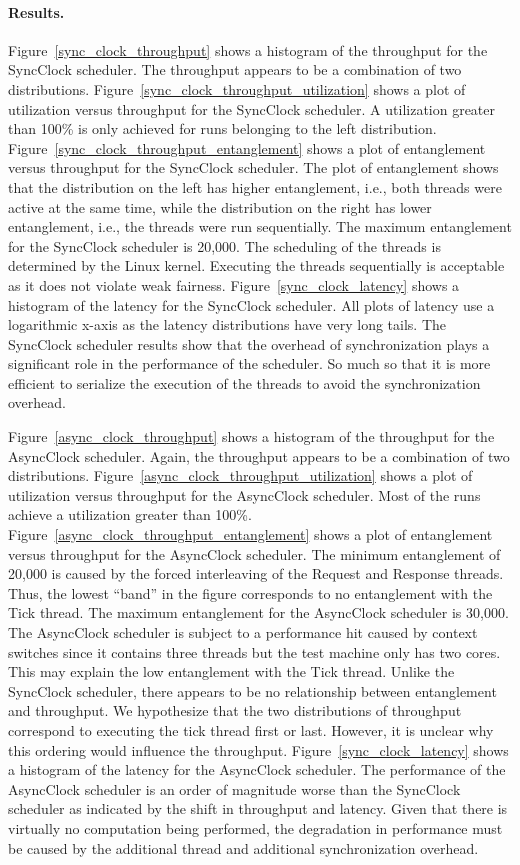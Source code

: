 \paragraph{Results.}
Figure~\ref{sync_clock_throughput} shows a histogram of the throughput for the SyncClock scheduler.
The throughput appears to be a combination of two distributions.
Figure~\ref{sync_clock_throughput_utilization} shows a plot of utilization versus throughput for the SyncClock scheduler.
A utilization greater than 100\% is only achieved for runs belonging to the left distribution.
Figure~\ref{sync_clock_throughput_entanglement} shows a plot of entanglement versus throughput for the SyncClock scheduler.
The plot of entanglement shows that the distribution on the left has higher entanglement, i.e., both threads were active at the same time, while the distribution on the right has lower entanglement, i.e., the threads were run sequentially.
The maximum entanglement for the SyncClock scheduler is 20,000.
The scheduling of the threads is determined by the Linux kernel.
Executing the threads sequentially is acceptable as it does not violate weak fairness.
Figure~\ref{sync_clock_latency} shows a histogram of the latency for the SyncClock scheduler.
All plots of latency use a logarithmic x-axis as the latency distributions have very long tails.
The SyncClock scheduler results show that the overhead of synchronization plays a significant role in the performance of the scheduler.
So much so that it is more efficient to serialize the execution of the threads to avoid the synchronization overhead.

Figure~\ref{async_clock_throughput} shows a histogram of the throughput for the AsyncClock scheduler.
Again, the throughput appears to be a combination of two distributions.
Figure~\ref{async_clock_throughput_utilization} shows a plot of utilization versus throughput for the AsyncClock scheduler.
Most of the runs achieve a utilization greater than 100\%.
Figure~\ref{async_clock_throughput_entanglement} shows a plot of entanglement versus throughput for the AsyncClock scheduler.
The minimum entanglement of 20,000 is caused by the forced interleaving of the Request and Response threads.
Thus, the lowest ``band'' in the figure corresponds to no entanglement with the Tick thread.
The maximum entanglement for the AsyncClock scheduler is 30,000.
The AsyncClock scheduler is subject to a performance hit caused by context switches since it contains three threads but the test machine only has two cores.
This may explain the low entanglement with the Tick thread.
Unlike the SyncClock scheduler, there appears to be no relationship between entanglement and throughput.
We hypothesize that the two distributions of throughput correspond to executing the tick thread first or last.
However, it is unclear why this ordering would influence the throughput.
Figure~\ref{sync_clock_latency} shows a histogram of the latency for the AsyncClock scheduler.
The performance of the AsyncClock scheduler is an order of magnitude worse than the SyncClock scheduler as indicated by the shift in throughput and latency.
Given that there is virtually no computation being performed, the degradation in performance must be caused by the additional thread and additional synchronization overhead.

